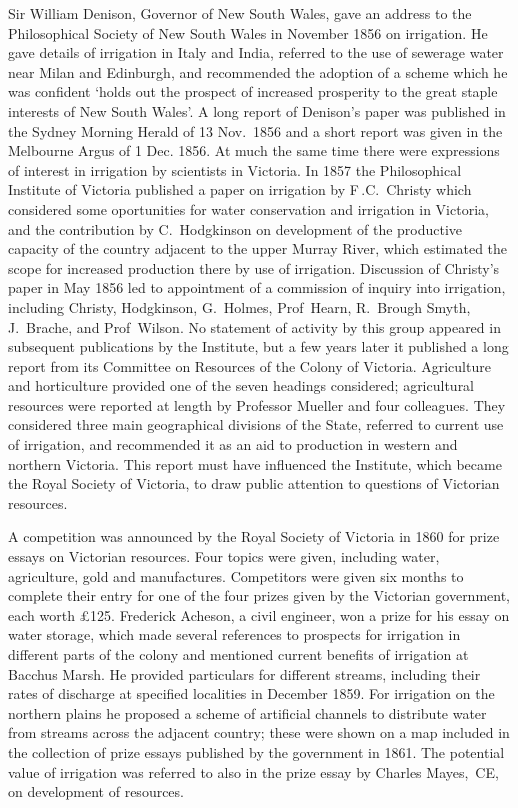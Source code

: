 Sir William Denison, Governor of New South Wales, gave an address to
the Philosophical Society of New South Wales in November 1856 on
irrigation.  He gave details of irrigation in Italy and India,
referred to the use of sewerage water near Milan and Edinburgh, and
recommended the adoption of a scheme which he was confident `holds out
the prospect of increased prosperity to the great staple interests of
New South Wales'.  A long report of Denison's paper was published in
the Sydney Morning Herald of 13 Nov.\ 1856 and a short report was
given in the Melbourne Argus of 1 Dec. 1856. At much the same time
there were expressions of interest in irrigation by scientists in
Victoria.  In 1857 the Philosophical Institute of Victoria published a
paper on irrigation by F\,.C.~Christy which considered some
oportunities for water conservation and irrigation in Victoria, and
the contribution by C.~Hodgkinson on development of the productive
capacity of the country adjacent to the upper Murray River, which
estimated the scope for increased production there by use of
irrigation.  Discussion of Christy's paper in May 1856 led to
appointment of a commission of inquiry into irrigation, including
Christy, Hodgkinson, G.~Holmes, Prof~Hearn, R.~Brough Smyth,
J.~Brache, and Prof~Wilson.  No statement of activity by this group
appeared in subsequent publications by the Institute, but a few years
later it published a long report from its Committee on Resources of
the Colony of Victoria.  Agriculture and horticulture provided one of
the seven headings considered; agricultural resources were reported at
length by Professor Mueller and four colleagues.  They considered
three main geographical divisions of the State, referred to current
use of irrigation, and recommended it as an aid to production in
western and northern Victoria.  This report must have influenced the
Institute, which became the Royal Society of Victoria, to draw public
attention to questions of Victorian resources.

A competition was announced by the Royal Society of Victoria in 1860
for prize essays on Victorian resources. Four topics were given,
including water, agriculture, gold and manufactures. Competitors were
given six months to complete their entry for one of the four prizes
given by the Victorian government, each worth \pounds125. Frederick
Acheson, a civil engineer, won a prize for his essay on water storage,
which made several references to prospects for irrigation in different
parts of the colony and mentioned current benefits of irrigation at
Bacchus Marsh.  He provided particulars for different streams,
including their rates of discharge at specified localities in December
1859.  For irrigation on the northern plains he proposed a scheme of
artificial channels to distribute water from streams across the
adjacent country; these were shown on a map included in the collection
of prize essays published by the government in 1861.  The potential
value of irrigation was referred to also in the prize essay by Charles
Mayes,~CE, on development of resources.

